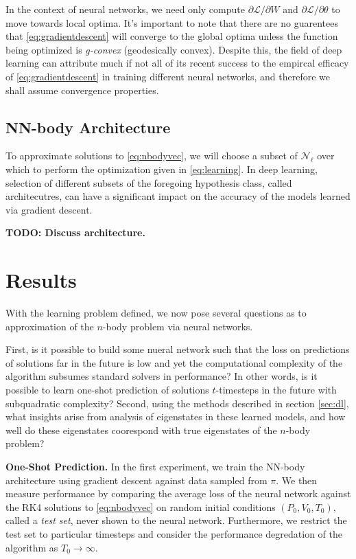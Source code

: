 \documentclass{article}
\numberwithin{theorem}{section}
\numberwithin{equation}{section}
\def\scriptl{{\mathcal L}}
\def\scriptn{{\mathcal N}}
\begin{document}
 In the context of neural networks, we need only compute $\partial \scriptl/\partial W$ and $\partial \scriptl/\partial \theta$ to move towards local optima. It's important to note that  there are no guarentees that \eqref{eq:gradientdescent} will converge to the global optima unless the function being optimized is \emph{g-convex} (geodesically convex). Despite this, the field of deep learning can attribute much if not all of its recent success to the empircal efficacy of \eqref{eq:gradientdescent} in training different neural networks, and therefore we shall assume convergence properties. 

 \subsection{NN-body Architecture}
To approximate solutions to \eqref{eq:nbodyvec}, we will choose a subset of $\scriptn_\ell$ over which to perform the optimization given in \eqref{eq:learning}. In deep learning, selection of different subsets of the foregoing hypothesis class, called architecutres, can have a significant impact on the accuracy of the models learned via gradient descent.


\textbf{TODO: Discuss architecture.}

 \section{Results}
With the learning problem defined, we now pose several questions as to approximation of the $n$-body problem via neural networks.

 First, is it possible to build some nueral network such that the loss on predictions of solutions far in the future is low and yet the computational complexity of the algorithm subsumes standard solvers in performance? In other words, is it possible to learn one-shot prediction of solutions $t$-timesteps in the future with subquadratic complexity? Second, using the methods described in section \ref{sec:dl}, what insights arise from analysis of eigenstates in these learned models, and how well do these eigenstates coorespond with true eigenstates of the $n$-body problem?

 \textbf{One-Shot Prediction.} In the first experiment, we train the NN-body architecture using gradient descent against data sampled from $\pi.$ We then measure performance by comparing the average loss of the neural network against the RK4 solutions to \eqref{eq:nbodyvec} on random initial conditions $(P_0, V_0, T_0),$ called a \emph{test set}, never shown to the neural network. Furthermore, we restrict the test set to particular timesteps and consider the performance degredation of the algorithm as $T_0 \to \infty.$ 
\end{document}
